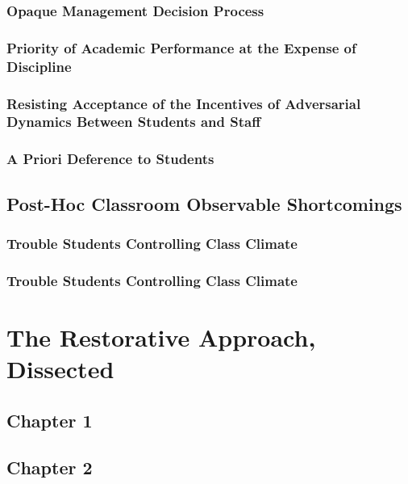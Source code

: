 \documentclass[12pt]{article}
\begin{document}
	\subsubsection{Opaque Management Decision Process}
	\subsubsection{Priority of Academic Performance at the Expense of Discipline}
	\subsubsection{Resisting Acceptance of the Incentives of Adversarial Dynamics Between Students and Staff}
	\subsubsection{A Priori Deference to Students}

	\subsection{Post-Hoc Classroom Observable Shortcomings}
	\subsubsection{Trouble Students Controlling Class Climate}
	\subsubsection{Trouble Students Controlling Class Climate}
	
	
	
	\section{The Restorative Approach, Dissected}
	\subsection{Chapter 1}
	\subsection{Chapter 2}
\end{document}

